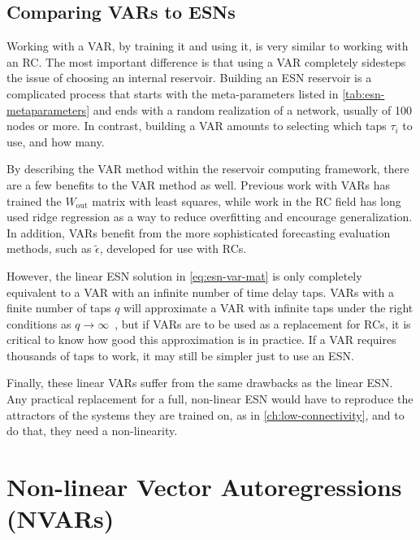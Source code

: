 \subsection{Comparing VARs to ESNs}

Working with a VAR, by training it and using it, is very similar to
working with an RC. The most important difference is that using a VAR
completely sidesteps the issue of choosing an internal
reservoir. Building an ESN reservoir is a complicated process that
starts with the meta-parameters listed in \cref{tab:esn-metaparameters}
and ends with a random realization of a network, usually of 100 nodes
or more. In contrast, building a VAR amounts to selecting which taps
$\tau_i$ to use, and how many.

By describing the VAR method within the reservoir computing framework,
there are a few benefits to the VAR method as well. Previous work with
VARs has trained the $W_\text{out}$ matrix with least squares, while
work in the RC field has long used ridge regression as a way to reduce
overfitting and encourage generalization. In addition, VARs benefit
from the more sophisticated forecasting evaluation methods, such as
$\tilde{\epsilon}$, developed for use with RCs.

However, the linear ESN solution in \cref{eq:esn-var-mat} is only
completely equivalent to a VAR with an infinite number of time delay
taps. VARs with a finite number of taps $q$ will approximate a VAR
with infinite taps under the right conditions as $q \rightarrow
\infty$~\cite{bollt2021}, but if VARs are to be used as a replacement
for RCs, it is critical to know how good this approximation is in
practice. If a VAR requires thousands of taps to work, it may still
be simpler just to use an ESN.

Finally, these linear VARs suffer from the same drawbacks as the
linear ESN. Any practical replacement for a full, non-linear ESN would have to
reproduce the attractors of the systems they are trained on, as in
\cref{ch:low-connectivity}, and to do that, they need a non-linearity.

\section{Non-linear Vector Autoregressions (NVARs)}\label{sec:nvar}

